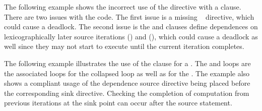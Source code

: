 The following example shows the incorrect use of the  
directive with a  clause.  There are two issues with the code.  
The first issue is a missing ~ directive,
which could cause a deadlock.  
The second issue is the  and  
clauses define dependences on lexicographically later 
source iterations () and (), which could cause 
a deadlock as well since they may not start to execute until the current iteration completes.




The following example illustrates the use of the  clause for
a .  The  and  loops are the associated
loops for the collapsed loop as well as for the .
The example also shows a compliant usage of the dependence source
directive being placed before the corresponding sink directive.
Checking the completion of computation from previous iterations at the sink point can occur after the source statement.



